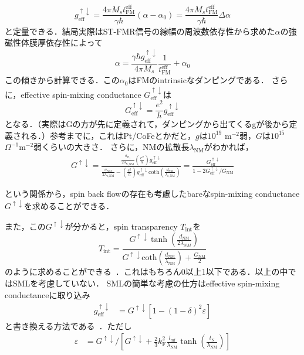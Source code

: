 \documentclass[12pt]{jsbook}
\begin{document}
\begin{equation}
g_{\mathrm{eff}}^{\uparrow \downarrow}=\frac{4 \pi M_{s} t_{\mathrm{FM}}^{\mathrm{eff}}}{\gamma \hbar}\left(\alpha-\alpha_{0}\right)=\frac{4 \pi M_{s} t_{\mathrm{FM}}^{\mathrm{eff}}}{\gamma \hbar} \Delta \alpha
\end{equation}
と定量できる．結局実際はST-FMR信号の線幅の周波数依存性から求めた$\alpha$の強磁性体膜厚依存性によって
\begin{equation}
\alpha = \frac{\gamma \hbar g_{\mathrm{eff}}^{\uparrow \downarrow}}{4 \pi M_{s} }\frac{1}{t_{\mathrm{FM}}^{\mathrm{eff}}}+ \alpha_0
\end{equation}
この傾きから計算できる．この$\alpha_0$はFMのintrinsicなダンピングである．
さらに，effective spin-mixing conductance $G_{\mathrm{eff}}^{\uparrow \downarrow}$は
\begin{equation}
G_{\mathrm{eff}}^{\uparrow \downarrow}= \frac{e^2}{h}g_{\mathrm{eff}}^{\uparrow \downarrow}
\end{equation}
となる．（実際はGの方が先に定義されて，ダンピングから出てくるgが後から定義される．）参考までに，これはPt/CoFeとかだと，$g$は$10^{19}$ m$^{-2}$弱，$G$は$10^{15}$ $\Omega^{-1}$m$^{-2}$弱くらいの大きさ．
さらに，NMの拡散長$\lambda_\mathrm{NM}$がわかれば，
\begin{eqnarray}
G^{\uparrow \downarrow}=\frac{\frac{\sigma_{\mathrm{P}_{\uparrow}}}{2 \lambda_{\mathrm{S}, \mathrm{NM}}}\left(\frac{e^{2}}{h}\right) g_{\mathrm{eff}}^{\uparrow \downarrow}}{\frac{\sigma_{\mathrm{NM}}}{2 \lambda_{\mathrm{s}, \mathrm{NM}}}-\left(\frac{e^{2}}{h}\right) g_{\mathrm{eff}}^{\uparrow \downarrow} \mathrm{coth}\left(\frac{d_{\mathrm{NM}}}{\lambda_{\mathrm{s}, \mathrm{NM}}}\right)}=\frac{G_{\mathrm{eff}}^{\uparrow \downarrow}}{1-2 G_{\mathrm{eff}}^{\uparrow \downarrow} / G_{\mathrm{NM}}}
\end{eqnarray}

という関係から，spin back flowの存在も考慮したbareなspin-mixing conductance $G^{\uparrow \downarrow}$を求めることができる．


また，この$G^{\uparrow \downarrow}$が分かると，spin transparency $T_\mathrm{int}$を
\begin{equation}
T_{\mathrm{int}}=\frac{G^{\uparrow \downarrow} \tanh \left(\frac{d_{\mathrm{NM}}}{2 \lambda_{NM}}\right)}{G^{\uparrow \downarrow} \mathrm{coth}\left(\frac{d_{\mathrm{NM}}}{\lambda_{\mathrm{NM}}}\right)+\frac{G_{\mathrm{NM}}}{2}}
\end{equation}
のように求めることができる~\cite{Zhang10.1038.nphys3304}．これはもちろん0以上1以下である．以上の中ではSMLを考慮していない．
SMLの簡単な考慮の仕方はeffective spin-mixing conductanceに取り込み
\begin{eqnarray}
g_{\mathrm{eff}}^{\uparrow \downarrow} &=G^{\uparrow \downarrow}\left[1-(1-\delta)^{2} \varepsilon\right]
\end{eqnarray}
と書き換える方法である~\cite{Taoeaat1670}．ただし
\begin{eqnarray}
\varepsilon &=G^{\uparrow \downarrow} /\left[G^{\uparrow \downarrow}+\frac{2}{3} k_{\mathrm{F}}^{2} \frac{l_{\mathrm{mf}}}{\lambda_{\mathrm{NM}}} \tanh \left(\frac{t_{\mathrm{N}}}{\lambda_{\mathrm{NM}}}\right)\right]
\end{eqnarray}
\end{document}

